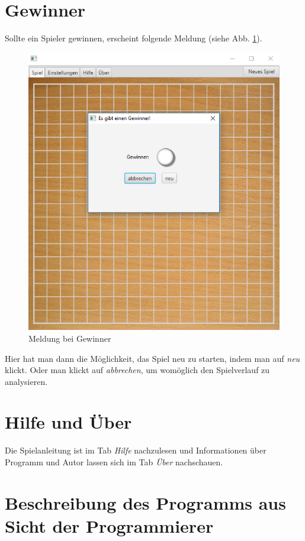 \documentclass[11pt]{article}
\newcommand{\1}{{\mathds{1}}}
\newcommand{\imagewidth}{.6\textheight}%
\begin{document}
	\section{Gewinner}
	\FloatBarrier
	Sollte ein Spieler gewinnen, erscheint folgende Meldung (siehe Abb. \ref{gewinner}).
	\begin{figure}[h]
		\centering
		\includegraphics[width=\imagewidth]{gewinner.png}
		\caption{Meldung bei Gewinner}
		\label{gewinner}
	\end{figure}

	Hier hat man dann die Möglichkeit, das Spiel neu zu starten, indem man auf \textit{neu} klickt.
	Oder man klickt auf \textit{abbrechen}, um womöglich den Spielverlauf zu analysieren. 
	\FloatBarrier
	
	\section{Hilfe und Über}
	Die Spielanleitung ist im Tab \textit{Hilfe} nachzulesen und Informationen über Programm und Autor lassen sich im Tab \textit{Über} nachschauen. 
	
	
	\section*{Beschreibung des Programms aus Sicht der Programmierer}
	
\end{document}
